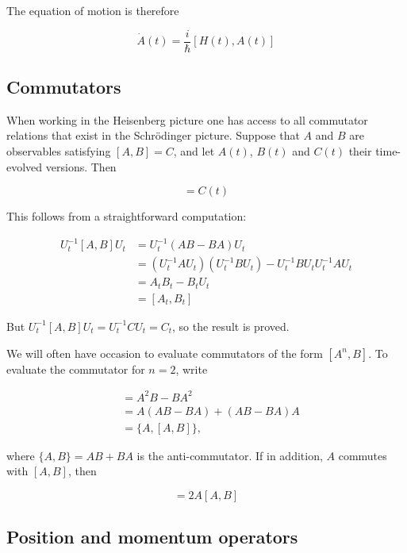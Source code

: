 The equation of motion is therefore

\begin{equation}
\dot A(t) =  \frac{i}{\hbar}[H(t),A(t)]
\end{equation}


\subsection{Commutators}

When working in  the Heisenberg picture one has access to all commutator relations that exist in the Schrödinger picture. Suppose that $A$ and $B$ are observables satisfying $[A,B] = C$, and let $A(t)$, $B(t)$ and $C(t)$ their time-evolved versions.
Then

\begin{equation}
[A(t), B(t)] = C(t)
\end{equation}

This follows from a straightforward computation:

\begin{align}
U_t^{-1} [A, B] U_t&= U_t^{-1} (AB  - BA) U_t \\
&= (U_t^{-1} AU_t)(U_t^{-1} BU_t)
 - U_t^{-1}BU_t U_t^{-1} AU_t \\
&= A_tB_t - B_t  U_t \\
&= [A_t, B_t]
\end{align}

But $U_t^{-1} [A, B] U_t = U_t^{-1} C U_t = C_t$, so the result is proved.

We will often have occasion to evaluate commutators of the form $[A^n,B]$.
To evaluate the commutator for  $n=2$, write

\begin{align}
[A^2, B] &= A^2B - BA^2 \\
 &= A (AB - BA) + (AB - BA) A \\
 &= \{A, [A, B] \},
\end{align}

where $\{A,B\} = AB + BA$ is the anti-commutator.  If in addition, $A$ commutes with $[A,B]$, then

\begin{equation}
[A^2, B] = 2A[A,B]
\end{equation}


\subsection{Position and momentum operators}

